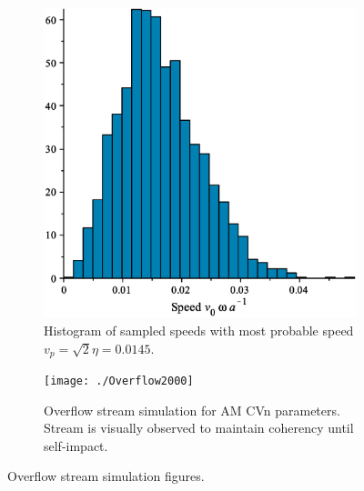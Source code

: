 \documentclass[preprint2]{aastex}
\begin{document}
\begin{figure}
        \centering
        \begin{subfigure}[b]{0.45\textwidth}
	        \centering
                \includegraphics[width=\textwidth]{./speed_hist}
                \caption{Histogram of sampled speeds with most probable speed $v_{p} = \sqrt{2}\eta = 0.0145$.}
                \label{fig.streamHist}
        \end{subfigure}%
        \quad %
        \begin{subfigure}[b]{0.45\textwidth}
        			\centering
                \texttt{[image: ./Overflow2000]}
                \caption{Overflow stream simulation for AM CVn parameters.  Stream
  is visually observed to maintain coherency until self-impact.}
                \label{fig.coherentStream}
        \end{subfigure}
        \caption{Overflow stream simulation figures.}
        \label{fig.streamSim}
\end{figure}

\end{document}
